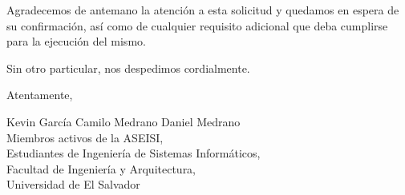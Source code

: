 \documentclass[12pt, a4paper]{letter} %
\begin{document}
Agradecemos de antemano la atención a esta solicitud y quedamos en espera de su confirmación, así como de cualquier requisito adicional que deba cumplirse para la ejecución del mismo.

Sin otro particular, nos despedimos cordialmente.

Atentamente,

\vspace{1.3cm}

Kevin García \hfill Camilo Medrano \hfill Daniel Medrano\\
Miembros activos de la ASEISI,\\
Estudiantes de Ingeniería de Sistemas Informáticos,\\
Facultad de Ingeniería y Arquitectura,\\
Universidad de El Salvador
\end{document}

